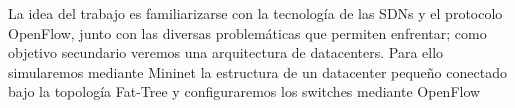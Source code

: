 La idea del trabajo es familiarizarse con la tecnología de las SDNs y el protocolo OpenFlow, junto con las diversas problemáticas que permiten enfrentar; como objetivo secundario veremos una arquitectura de datacenters. Para ello simularemos mediante Mininet la estructura de un datacenter pequeño conectado bajo la topología Fat-Tree y configuraremos los switches mediante OpenFlow
